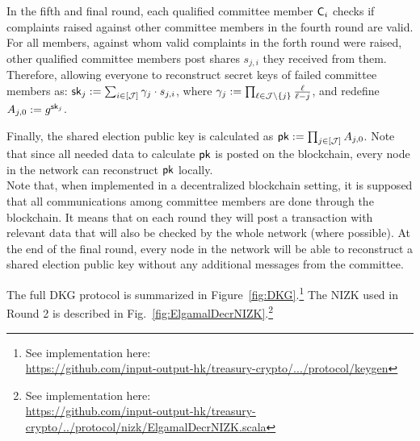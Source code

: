 In the fifth and final round, each qualified committee member $\mathsf{C}_i$ checks if complaints raised against other committee members in the fourth round are valid. For all members, against whom valid complaints in the forth round were raised, other qualified committee members post shares $s_{j,i}$ they received from them. Therefore, allowing everyone to reconstruct secret keys of failed committee members as: $\mathsf{sk}_{j} := \sum_{i\in[\mathcal{J}]} \gamma_{j} \cdot s_{j,i}$, where $\gamma_{j}:= \prod_{\ell\in \mathcal{J}\setminus \{j\} } \frac{\ell}{\ell-j}$, and redefine $A_{j,0}:= g^{\mathsf{sk}_{j}}$. 

Finally, the shared election public key is calculated as $\mathsf{pk} := \prod_{j\in[\mathcal{J}]}  A_{j,0}$. Note that since all needed data to calculate $\mathsf{pk}$ is posted on the blockchain, every node in the network can reconstruct $\mathsf{pk}$ locally.\\

Note that, when implemented in a decentralized blockchain setting, it is supposed that all communications among committee members are done through the blockchain. It means that on each round they will post a transaction with relevant data that will also be checked by the whole network (where possible). At the end of the final round, every node in the network will be able to reconstruct a shared election public key without any additional messages from the committee. 

The full DKG protocol is summarized in Figure~\ref{fig:DKG}.\footnote{See implementation here:\\ \href{https://github.com/input-output-hk/treasury-crypto/tree/master/src/main/scala/io/iohk/protocol/keygen}{https://github.com/input-output-hk/treasury-crypto/.../protocol/keygen}} The NIZK used in Round 2 is described in Fig.~\ref{fig:ElgamalDecrNIZK}.\footnote{See implementation here:\\ \href{https://github.com/input-output-hk/treasury-crypto/blob/master/src/main/scala/io/iohk/protocol/nizk/ElgamalDecrNIZK.scala}{https://github.com/input-output-hk/treasury-crypto/../protocol/nizk/ElgamalDecrNIZK.scala}}

